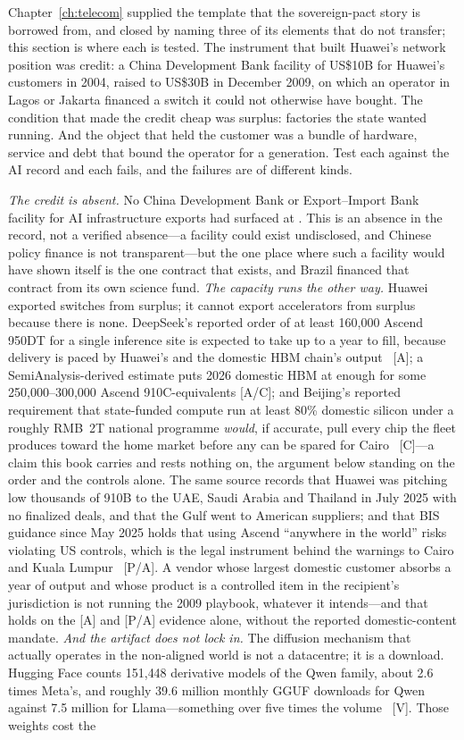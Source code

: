 Chapter~\ref{ch:telecom} supplied the template that the sovereign-pact story is borrowed from, and closed by naming three of its elements that do not transfer; this section is where each is tested. The instrument that built Huawei's network position was credit: a China Development Bank facility of US\$10B for Huawei's customers in 2004, raised to US\$30B in December 2009, on which an operator in Lagos or Jakarta financed a switch it could not otherwise have bought. The condition that made the credit cheap was surplus: factories the state wanted running. And the object that held the customer was a bundle of hardware, service and debt that bound the operator for a generation. Test each against the AI record and each fails, and the failures are of different kinds.

\emph{The credit is absent.} No China Development Bank or Export--Import Bank facility for AI infrastructure exports had surfaced at \datafreeze. This is an absence in the record, not a verified absence---a facility could exist undisclosed, and Chinese policy finance is not transparent---but the one place where such a facility would have shown itself is the one contract that exists, and Brazil financed that contract from its own science fund. \emph{The capacity runs the other way.} Huawei exported switches from surplus; it cannot export accelerators from surplus because there is none. DeepSeek's reported order of at least 160{,}000 Ascend 950DT for a single inference site is expected to take up to a year to fill, because delivery is paced by Huawei's and the domestic HBM chain's output~\cite{deepseek-ascend-order} [A]; a SemiAnalysis-derived estimate puts 2026 domestic HBM at enough for some 250{,}000--300{,}000 Ascend 910C-equivalents [A/C]; and Beijing's reported requirement that state-funded compute run at least 80\% domestic silicon under a roughly RMB~2T national programme \emph{would}, if accurate, pull every chip the fleet produces toward the home market before any can be spared for Cairo~\cite{ascend-supply-ceiling} [C]---a claim this book carries and rests nothing on, the argument below standing on the order and the controls alone. The same source records that Huawei was pitching low thousands of 910B to the UAE, Saudi Arabia and Thailand in July 2025 with no finalized deals, and that the Gulf went to American suppliers; and that BIS guidance since May 2025 holds that using Ascend ``anywhere in the world'' risks violating US controls, which is the legal instrument behind the warnings to Cairo and Kuala Lumpur~\cite{ascend-supply-ceiling} [P/A]. A vendor whose largest domestic customer absorbs a year of output and whose product is a controlled item in the recipient's jurisdiction is not running the 2009 playbook, whatever it intends---and that holds on the [A] and [P/A] evidence alone, without the reported domestic-content mandate. \emph{And the artifact does not lock in.} The diffusion mechanism that actually operates in the non-aligned world is not a datacentre; it is a download. Hugging Face counts 151{,}448 derivative models of the Qwen family, about 2.6 times Meta's, and roughly 39.6 million monthly GGUF downloads for Qwen against 7.5 million for Llama---something over five times the volume~\cite{qwen-derivatives} [V]. Those weights cost the 